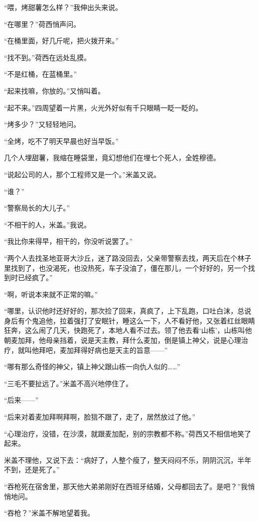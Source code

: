 \par “喂，烤甜薯怎么样？”我伸出头来说。
\par “在哪里？”荷西悄声问。
\par “在桶里面，好几斤呢，把火拨开来。”
\par “找不到。”荷西在远处乱摸。
\par “不是红桶，在蓝桶里。”
\par “起来找嘛，你放的。”又悄叫着。
\par “起不来。”四周望着一片黑，火光外好似有千只眼睛一眨一眨的。
\par “烤多少？”又轻轻地问。
\par “全烤，吃不了明天早晨也好当早饭。”
\par 几个人埋甜薯，我缩在睡袋里，竟幻想他们在埋七个死人，全姓穆德。
\par “说起公司的人，那个工程师又是一个。”米盖又说。
\par “谁？”
\par “警察局长的大儿子。”
\par “不相干的人，米盖。”我说。
\par “我比你来得早，相干的，你没听说罢了。”
\par “两个人去找圣地亚哥大沙丘，迷了路没回去，父亲带警察去找，两天后在个林子里找到了，也没渴死，也没热死，车子没油了，僵在那儿，一个好好的，另一个找到时已经疯了。”
\par “啊，听说本来就不正常的嘛。”
\par “哪里，认识他时还好好的，那次捡了回来，真疯了，上下乱跑，口吐白沫，总说身后有个鬼追他，拉着强打了安眠针，睡这么一下，人不看好他，又张着红丝眼睛狂奔，这么闹了几天，快跑死了，本地人看不过去。领了他去看‘山栋’，山栋叫他朝麦加拜，他母亲挡着，说是天主教，拜什么麦加，倒是镇上神父，说是心理治疗，就叫他拜吧，麦加拜得好病也是天主的旨意——”
\par “哪有那么奇怪的神父，镇上神父跟山栋一向仇人似的……”
\par “三毛不要扯远了。”米盖不高兴地停住了。
\par “后来——”
\par “后来对着麦加拜啊拜啊，脸狺不跟了，走了，居然放过了他。”
\par “心理治疗，没错，在沙漠，就跟麦加配，别的宗教都不称。”荷西又不相信地笑了起来。
\par 米盖不理他，又说下去：“病好了，人整个瘦了，整天闷闷不乐，阴阴沉沉，半年不到，还是死了。”
\par “吞枪死在宿舍里，那天他大弟弟刚好在西班牙结婚，父母都回去了。是吧？”我悄悄地问。
\par “吞枪？”米盖不解地望着我。
